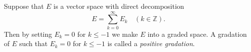 Suppose that $E$ is a vector space with direct decomposition
$$E = \sum_{k=0}^{\infty} E_k \quad (k \in \mathbb{Z}).$$
Then by setting $E_k = 0$ for $k \leq -1$ we make $E$ into a graded space. A gradation of $E$ such that $E_k = 0$ for $k \leq -1$ is called a \textit{positive gradation}.

